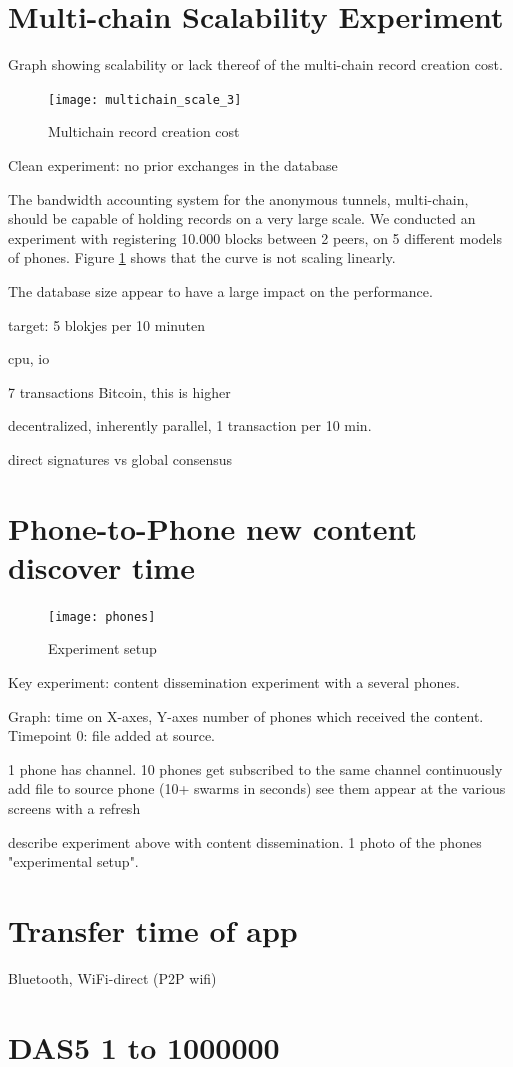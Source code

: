 \section{Multi-chain Scalability Experiment}

Graph showing scalability or lack thereof of the multi-chain record creation cost.

\begin{figure}[h]
	\centering
	\texttt{[image: multichain\_scale\_3]}
	\caption{Multichain record creation cost}
	\label{fig:multichain_scale}
\end{figure}

Clean experiment: no prior exchanges in the database

 


The bandwidth accounting system for the anonymous tunnels, multi-chain, should be capable of holding records on a very large scale.
We conducted an experiment with registering 10.000 blocks between 2 peers, on 5 different models of phones.
Figure \ref{fig:multichain_scale} shows that the curve is not scaling linearly.

The database size appear to have a large impact on the performance. \cite{db_performance}

target: 5 blokjes per 10 minuten

cpu, io

7 transactions Bitcoin, this is higher

decentralized, inherently parallel, 1 transaction per 10 min.

direct signatures vs global consensus


\section{Phone-to-Phone new content discover time}

\begin{figure}[h]
	\centering
	\texttt{[image: phones]}
	\caption{Experiment setup}
	\label{fig:phones}
\end{figure}

Key experiment: content dissemination experiment with a several phones.

Graph: time on X-axes, Y-axes number of phones which received the content. Timepoint 0: file added at source.

1 phone has channel.
10 phones get subscribed to the same channel
continuously add file to source phone (10+ swarms in seconds)
see them appear at the various screens with a refresh

describe experiment above with content dissemination. 1 photo of the phones "experimental setup".


\section{Transfer time of app}

Bluetooth,
WiFi-direct (P2P wifi)


\section{DAS5 1 to 1000000} 

